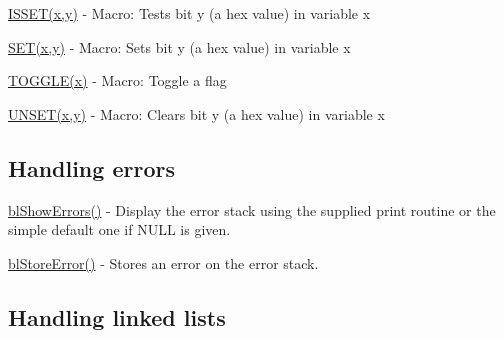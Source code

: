 \begin{DoxyItemize}
\item \hyperlink{macros_8h_a307d2122f7c72a7f479498fa945596c6}{I\-S\-S\-E\-T(x,y)} -\/ Macro\-: Tests bit y (a hex value) in variable x
\item \hyperlink{macros_8h_a4c7a0b25a3e3f49dbb53268ccbb2ffe4}{S\-E\-T(x,y)} -\/ Macro\-: Sets bit y (a hex value) in variable x
\item \hyperlink{macros_8h_a10801dd855e20334cd83cace96616de6}{T\-O\-G\-G\-L\-E(x)} -\/ Macro\-: Toggle a flag
\item \hyperlink{macros_8h_a6d57407eac46b22a85510405f2370d64}{U\-N\-S\-E\-T(x,y)} -\/ Macro\-: Clears bit y (a hex value) in variable x
\end{DoxyItemize}

\subsection*{Handling errors }


\begin{DoxyItemize}
\item \hyperlink{_err_stack_8c_a42ec3c99acc8e5f9e3300876521f4c00}{bl\-Show\-Errors()} -\/ Display the error stack using the supplied print routine or the simple default one if N\-U\-L\-L is given.
\item \hyperlink{_err_stack_8c_a1760e9ed0da602c2b3c9ab6935ce758d}{bl\-Store\-Error()} -\/ Stores an error on the error stack.
\end{DoxyItemize}

\subsection*{Handling linked lists }


